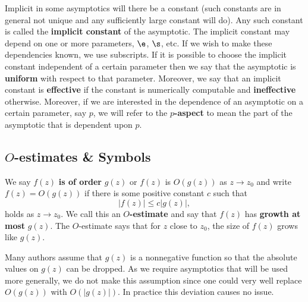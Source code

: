       Implicit in some asymptotics will there be a constant (such constants are in general not unique and any sufficiently large constant will do). Any such constant is called the \textbf{implicit constant} of the asymptotic. The implicit constant may depend on one or more parameters, $\e$, $\s$, etc. If we wish to make these dependencies known, we use subscripts. If it is possible to choose the implicit constant independent of a certain parameter then we say that the asymptotic is \textbf{uniform} with respect to that parameter. Moreover, we say that an implicit constant is \textbf{effective} if the constant is numerically computable and \textbf{ineffective} otherwise. Moreover, if we are interested in the dependence of an asymptotic on a certain parameter, say $p$, we will refer to the \textbf{$p$-aspect} to mean the part of the asymptotic that is dependent upon $p$.
      \subsection*{\texorpdfstring{$O$}{O}-estimates \& Symbols}
        We say $f(z)$ \textbf{is of order} $g(z)$ or $f(z)$ is $O(g(z))$ as $z \to z_{0}$ and write $f(z) = O(g(z))$
        if there is some positive constant $c$ such that
        \[
          |f(z)| \le c|g(z)|,
        \]
        holds as $z \to z_{0}$. We call this an \textbf{$O$-estimate} and say that $f(z)$ has \textbf{growth at most} $g(z)$. The $O$-estimate says that for $z$ close to $z_{0}$, the size of $f(z)$ grows like $g(z)$.
        
        \begin{remark}
          Many authors assume that $g(z)$ is a nonnegative function so that the absolute values on $g(z)$ can be dropped. As we require asymptotics that will be used more generally, we do not make this assumption since one could very well replace $O(g(z))$ with $O(|g(z)|)$. In practice this deviation causes no issue.
        \end{remark}
        
